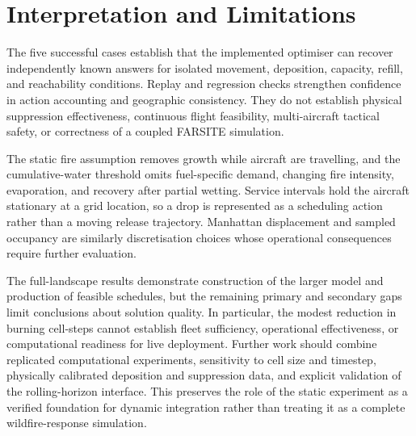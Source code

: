 \section{Interpretation and Limitations}
\label{sec:validation-limitations}

The five successful cases establish that the implemented optimiser can recover independently known answers for isolated movement, deposition, capacity, refill, and reachability conditions. Replay and regression checks strengthen confidence in action accounting and geographic consistency. They do not establish physical suppression effectiveness, continuous flight feasibility, multi-aircraft tactical safety, or correctness of a coupled FARSITE simulation.

The static fire assumption removes growth while aircraft are travelling, and the cumulative-water threshold omits fuel-specific demand, changing fire intensity, evaporation, and recovery after partial wetting. Service intervals hold the aircraft stationary at a grid location, so a drop is represented as a scheduling action rather than a moving release trajectory. Manhattan displacement and sampled occupancy are similarly discretisation choices whose operational consequences require further evaluation.

The full-landscape results demonstrate construction of the larger model and production of feasible schedules, but the remaining primary and secondary gaps limit conclusions about solution quality. In particular, the modest reduction in burning cell-steps cannot establish fleet sufficiency, operational effectiveness, or computational readiness for live deployment. Further work should combine replicated computational experiments, sensitivity to cell size and timestep, physically calibrated deposition and suppression data, and explicit validation of the rolling-horizon interface. This preserves the role of the static experiment as a verified foundation for dynamic integration rather than treating it as a complete wildfire-response simulation.
